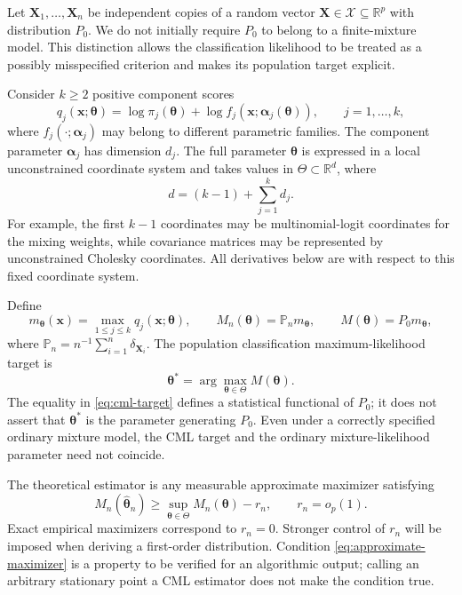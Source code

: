Let $\mathbf{X}_1,\ldots,\mathbf{X}_n$ be independent copies of a random vector
$\mathbf{X}\in\mathcal X\subseteq\mathbb R^p$ with distribution $P_0$.  We do not
initially require $P_0$ to belong to a finite-mixture model.  This distinction
allows the classification likelihood to be treated as a possibly
misspecified criterion and makes its population target explicit.

Consider $k\geq2$ positive component scores
\begin{equation}
 q_j(\mathbf{x};\boldsymbol{\theta})=\log\pi_j(\boldsymbol{\theta})+\log f_j(\mathbf{x};\boldsymbol{\alpha}_j(\boldsymbol{\theta})),
 \qquad j=1,\ldots,k,
 \label{eq:component-score}
\end{equation}
where $f_j(\cdot;\boldsymbol{\alpha}_j)$ may belong to different parametric families.  The
component parameter $\boldsymbol{\alpha}_j$ has dimension $d_j$.  The full parameter
$\boldsymbol{\theta}$ is expressed in a local unconstrained coordinate system and takes
values in $\Theta\subset\mathbb R^d$, where
\begin{equation}
 d=(k-1)+\sum_{j=1}^k d_j.
 \label{eq:parameter-dimension}
\end{equation}
For example, the first $k-1$
coordinates may be multinomial-logit coordinates for the mixing weights,
while covariance matrices may be represented by unconstrained Cholesky
coordinates.  All derivatives below are with respect to this fixed coordinate
system.

Define
\begin{equation}
 m_{\boldsymbol{\theta}}(\mathbf{x})=\max_{1\leq j\leq k}q_j(\mathbf{x};\boldsymbol{\theta}),\qquad
 M_n(\boldsymbol{\theta})=\mathbb P_n m_{\boldsymbol{\theta}},\qquad
 M(\boldsymbol{\theta})=P_0m_{\boldsymbol{\theta}},
 \label{eq:cml-criteria}
\end{equation}
where $\mathbb P_n=n^{-1}\sum_{i=1}^n\delta_{\mathbf{X}_i}$.  The population
classification maximum-likelihood target is
\begin{equation}
 \boldsymbol{\theta}^*=\arg\max_{\boldsymbol{\theta}\in\Theta}M(\boldsymbol{\theta}).
 \label{eq:cml-target}
\end{equation}
The equality in \eqref{eq:cml-target} defines a statistical functional of
$P_0$; it does not assert that $\boldsymbol{\theta}^*$ is the parameter generating $P_0$.
Even under a correctly specified ordinary mixture model, the CML target and
the ordinary mixture-likelihood parameter need not coincide.

The theoretical estimator is any measurable approximate maximizer satisfying
\begin{equation}
 M_n(\widehat{\boldsymbol{\theta}}_n)
 \geq \sup_{\boldsymbol{\theta}\in\Theta}M_n(\boldsymbol{\theta})-r_n,
 \qquad r_n=o_p(1).
 \label{eq:approximate-maximizer}
\end{equation}
Exact empirical maximizers correspond to $r_n=0$.  Stronger control of $r_n$
will be imposed when deriving a first-order distribution.  Condition
\eqref{eq:approximate-maximizer} is a property to be verified for an
algorithmic output; calling an arbitrary stationary point a CML estimator does
not make the condition true.

